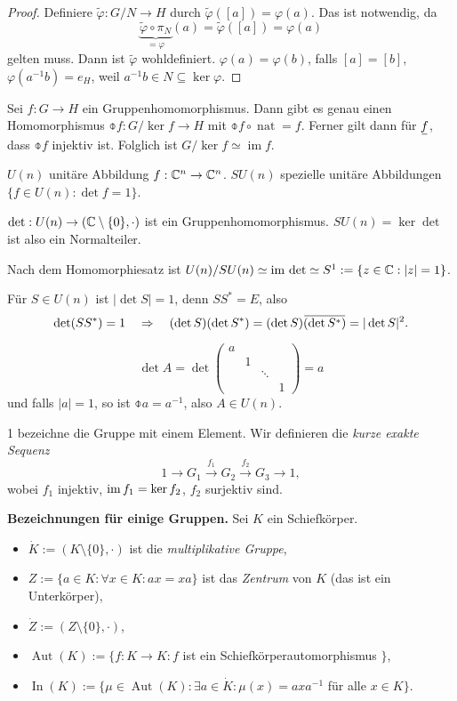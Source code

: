 \begin{proof}
 Definiere $\tilde{\varphi} : G / N \to H$ durch $\tilde{\varphi}([a]) = \varphi(a)$. Das ist notwendig, da
 \[ \underbrace{\tilde{\varphi} \circ \pi_N}_{=\varphi} (a) = \tilde{\varphi}( [a] ) = \varphi(a) \]
 gelten muss. Dann ist $\tilde{\varphi}$ wohldefiniert.
 $\varphi(a) = \varphi(b)$, falls $[a] = [b]$, $\varphi( a^{-1} b ) = e_H$, weil $a^{-1} b \in N \subseteq \ker \varphi$.
\end{proof}

\begin{thm}[Homomorphiesatz]
 Sei $f: G  \to H$ ein Gruppenhomomorphismus. Dann gibt es genau einen Homomorphismus $\obar{f} : G / \ker f \to H$ mit $\obar{f} \circ \operatorname{nat} = f$. Ferner gilt dann für $\ubar{f}$, dass $\obar{f}$ injektiv ist. Folglich ist $G / \ker f \simeq \operatorname{im} f$.
\end{thm}

$U(n)$ unitäre Abbildung $f: \mathbb{C}^n \to \mathbb{C}^n$. $SU(n)$ spezielle unitäre Abbildungen $\{ f \in U(n) : \det f = 1 \}$.

$\det : U(n) \to (\mathbb{C} \setminus \{ 0 \}, \cdot )$ ist ein Gruppenhomomorphismus. $SU(n) = \ker \det$ ist also ein Normalteiler.

Nach dem Homomorphiesatz ist $U(n) / SU(n) \simeq \mathrm{im}\, \det \simeq S^1 := \{ z \in \mathbb{C} : |z| = 1 \}$.

Für $S \in U(n)$ ist $| \det S | = 1$, denn $S S^* = E$, also 
\[ \det( S S^* ) = 1 \qRq (\det S)(\det S^*) = (\det S)\obar{(\det S^*)} = |\det S |^2. \]

\[ \det A = \det \begin{pmatrix} a \\ & 1 \\ & & \ddots \\ & & & 1 \end{pmatrix} = a \]
und falls $|a| = 1$, so ist $\obar{a} = a^{-1}$, also $A \in U(n)$.

1 bezeichne die Gruppe mit einem Element. Wir definieren die \emph{kurze exakte Sequenz}
\[ 1 \to G_1 \xrightarrow{f_1} G_2 \xrightarrow{f_2} G_3 \to 1, \]
wobei $f_1$ injektiv, $\mathrm{im}\, f_1 = \ker f_2$, $f_2$ surjektiv sind.

\textbf{Bezeichnungen für einige Gruppen.}
Sei $K$ ein Schiefkörper.
\begin{itemize}
 \item $\dot{K} := ( K \setminus \{ 0 \}, \cdot)$ ist die \emph{multiplikative Gruppe},
 \item $Z := \{ a \in K : \forall x \in K : ax = xa \}$ ist das \emph{Zentrum} von $K$ (das ist ein Unterkörper),
 \item $\dot{Z} := ( Z \setminus \{ 0 \}, \cdot)$,
 \item $\operatorname{Aut}(K) := \{ f : K \to K : f$ ist ein Schiefkörperautomorphismus $\}$,
 \item $\operatorname{In}(K) := \{ \mu \in \operatorname{Aut} (K) : \exists a \in \dot{K} : \mu(x) = a x a^{-1}$ für alle $x \in K \}$.
\end{itemize}

